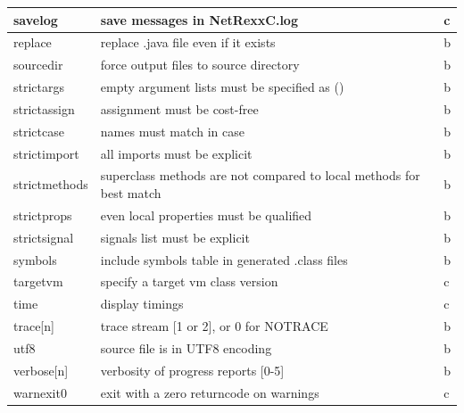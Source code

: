 \begin{longtable}[l]{|l|p{10cm}|l|}
\hline
 savelog      & save messages in NetRexxC.log &c \\
\hline
 replace      & replace .java file even if it exists &b \\
\hline
 sourcedir    & force output files to source directory &b \\
\hline
 strictargs   & empty argument lists must be specified as () &b \\
\hline
 strictassign & assignment must be cost-free &b \\
\hline
 strictcase   & names must match in case &b \\
\hline
 strictimport & all imports must be explicit &b \\
\hline
 strictmethods & superclass methods are not compared to local methods for best match &b \\
\hline
 strictprops  & even local properties must be qualified &b \\
\hline
 strictsignal & signals list must be explicit &b \\
\hline
 symbols      & include symbols table in generated .class files &b \\
\hline
 targetvm     & specify a target vm class version &c \\
\hline
 time         & display timings &c \\
\hline
 trace[n]     & trace stream [1 or 2], or 0 for NOTRACE &b \\
\hline
 utf8         & source file is in UTF8 encoding &b \\
\hline
 verbose[n]   & verbosity of progress reports [0-5] &b \\
\hline
 warnexit0    & exit with a zero returncode on warnings &c \\
\hline
\end{longtable}

